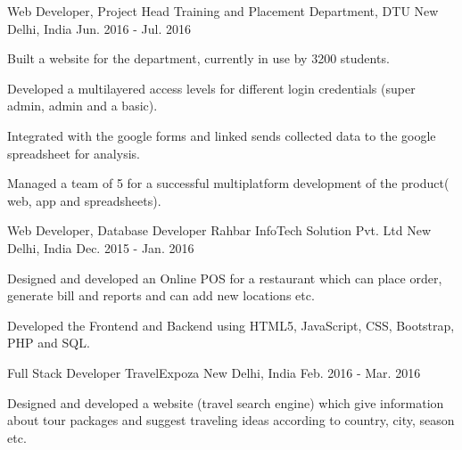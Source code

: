 \begin{cventries}

\cventry
{Web Developer, Project Head} %
{Training and Placement Department, DTU} %
{New Delhi, India} %
{Jun. 2016 - Jul. 2016} %
{ %
\begin{cvitems}
\item {Built a website for the department, currently in use by 3200 students.
}
\item {Developed a multilayered access levels for different login credentials (super admin, admin and a basic).
}
\item {Integrated with the google forms and linked sends collected data to the google spreadsheet for analysis.
}
\item {Managed a team of 5 for a successful multiplatform development of the product( web, app and spreadsheets).
}
\end{cvitems}
}


\cventry
{Web Developer, Database Developer} %
{Rahbar InfoTech Solution Pvt. Ltd} %
{New Delhi, India} %
{Dec. 2015 - Jan. 2016} %
{ %
\begin{cvitems}
\item {Designed and developed an Online POS for a restaurant which can place order, generate bill and reports and can add new locations etc.
}
\item {Developed the Frontend and Backend using HTML5, JavaScript, CSS, Bootstrap, PHP and SQL.
}
\end{cvitems}
}


\cventry
{Full Stack Developer} %
{TravelExpoza} %
{New Delhi, India} %
{Feb. 2016 - Mar. 2016} %
{ %
\begin{cvitems}
\item {Designed and developed a website (travel search engine) which give information about tour packages and suggest traveling ideas according to country, city, season etc.
}
\end{cvitems}
}



\end{cventries}
